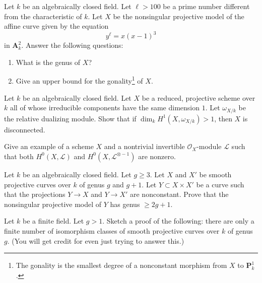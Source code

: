 \begin{exercise}
\label{exercise-compute-degree}
Let $k$ be an algebraically closed field.
Let $\ell > 100$ be a prime number different from the
characteristic of $k$. Let $X$ be the nonsingular projective model
of the affine curve given by the equation
$$
y^\ell = x(x - 1)^3
$$
in $\mathbf{A}^2_k$. Answer the following questions:
\begin{enumerate}
\item What is the genus of $X$?
\item Give an upper bound for the
gonality\footnote{The gonality is the smallest degree of a nonconstant
morphism from $X$ to $\mathbf{P}^1_k$.} of $X$.
\end{enumerate}
\end{exercise}

\begin{exercise}
\label{exercise-count-components}
Let $k$ be an algebraically closed field. Let $X$ be a reduced,
projective scheme over $k$ all of whose irreducible components
have the same dimension $1$. Let $\omega_{X/k}$ be the
relative dualizing module. Show that if
$\dim_k H^1(X, \omega_{X/k}) > 1$, then $X$ is disconnected.
\end{exercise}

\begin{exercise}
\label{exercise-sections-L-L-inverse}
Give an example of a scheme $X$ and a nontrivial invertible
$\mathcal{O}_X$-module $\mathcal{L}$ such that both
$H^0(X, \mathcal{L})$ and $H^0(X, \mathcal{L}^{\otimes -1})$
are nonzero.
\end{exercise}

\begin{exercise}
\label{exercise-in-product}
Let $k$ be an algebraically closed field. Let $g \geq 3$.
Let $X$ and $X'$ be smooth projective curves over $k$ of
genus $g$ and $g + 1$. Let $Y \subset X \times X'$
be a curve such that the projections $Y \to X$ and $Y \to X'$
are nonconstant. Prove that the nonsingular projective model
of $Y$ has genus $\geq 2g + 1$.
\end{exercise}

\begin{exercise}
\label{exercise-finitely-many}
Let $k$ be a finite field. Let $g > 1$. Sketch a proof of the following:
there are only a finite number of isomorphism classes of
smooth projective curves over $k$ of genus $g$.
(You will get credit for even just trying to answer this.)
\end{exercise}







